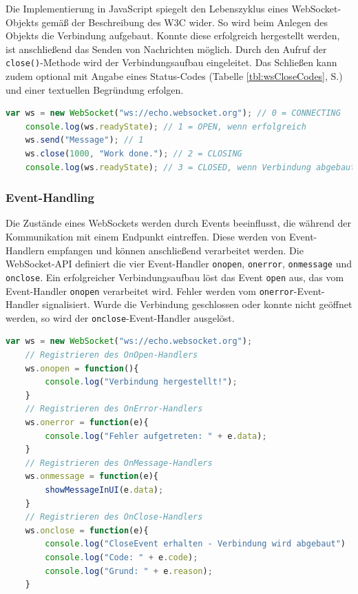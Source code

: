 \documentclass[11pt,a4paper,titlepage]{scrartcl}
\numberwithin{equation}{section}
\begin{document}
\noindent Die Implementierung in JavaScript spiegelt den Lebenszyklus eines WebSocket-Objekts gemäß der Beschreibung des W3C wider. So wird beim Anlegen des Objekts die Verbindung aufgebaut. Konnte diese erfolgreich hergestellt werden, ist anschließend das Senden von Nachrichten möglich. Durch den Aufruf der \texttt{close()}-Methode wird der Verbindungsaufbau eingeleitet. Das Schließen kann zudem optional mit Angabe eines Status-Codes (Tabelle \ref{tbl:wsCloseCodes}, S.\pageref{tbl:wsCloseCodes}) und einer textuellen Begründung erfolgen.\\

\begin{lstlisting}[frame=single, language=JavaScript, caption=WebSocket-Lebenszyklus]
	var ws = new WebSocket("ws://echo.websocket.org"); // 0 = CONNECTING
	console.log(ws.readyState); // 1 = OPEN, wenn erfolgreich
	ws.send("Message"); // 1
	ws.close(1000, "Work done."); // 2 = CLOSING
	console.log(ws.readyState); // 3 = CLOSED, wenn Verbindung abgebaut
\end{lstlisting}

\subsubsection{Event-Handling}
Die Zustände eines WebSockets werden durch Events beeinflusst, die während der Kommunikation mit einem Endpunkt eintreffen. Diese werden von Event-Handlern empfangen und können anschließend verarbeitet werden. Die WebSocket-API definiert die vier Event-Handler \texttt{onopen}, \texttt{onerror}, \texttt{onmessage} und \texttt{onclose}. Ein erfolgreicher Verbindungsaufbau löst das Event \texttt{open} aus, das vom Event-Handler \texttt{onopen} verarbeitet wird. Fehler werden vom \texttt{onerror}-Event-Handler signalisiert. Wurde die Verbindung geschlossen oder konnte nicht geöffnet werden, so wird der \texttt{onclose}-Event-Handler ausgelöst. \\

\begin{lstlisting}[frame=single, language=JavaScript, caption=WebSocket-Event-Handler]
	var ws = new WebSocket("ws://echo.websocket.org");
	// Registrieren des OnOpen-Handlers
	ws.onopen = function(){
		console.log("Verbindung hergestellt!");
	}
	// Registrieren des OnError-Handlers
	ws.onerror = function(e){
		console.log("Fehler aufgetreten: " + e.data);
	}	
	// Registrieren des OnMessage-Handlers
	ws.onmessage = function(e){
		showMessageInUI(e.data);
	}
	// Registrieren des OnClose-Handlers
	ws.onclose = function(e){
		console.log("CloseEvent erhalten - Verbindung wird abgebaut")
		console.log("Code: " + e.code);
		console.log("Grund: " + e.reason);
	}
\end{lstlisting} \vspace{-4mm}
\end{document}
